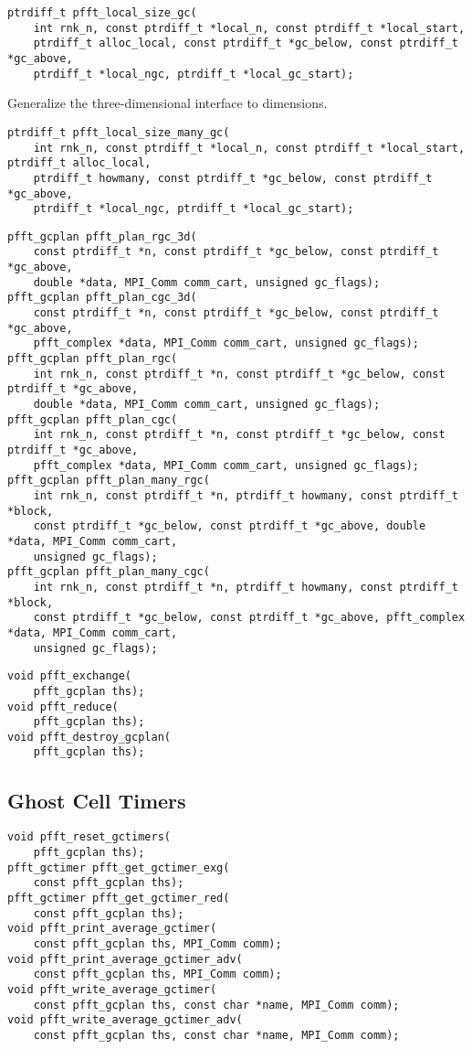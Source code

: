 \begin{lstlisting}
ptrdiff_t pfft_local_size_gc(
    int rnk_n, const ptrdiff_t *local_n, const ptrdiff_t *local_start,
    ptrdiff_t alloc_local, const ptrdiff_t *gc_below, const ptrdiff_t *gc_above,
    ptrdiff_t *local_ngc, ptrdiff_t *local_gc_start);
\end{lstlisting}
Generalize the three-dimensional interface to  dimensions.
\begin{lstlisting}
ptrdiff_t pfft_local_size_many_gc(
    int rnk_n, const ptrdiff_t *local_n, const ptrdiff_t *local_start, ptrdiff_t alloc_local,
    ptrdiff_t howmany, const ptrdiff_t *gc_below, const ptrdiff_t *gc_above,
    ptrdiff_t *local_ngc, ptrdiff_t *local_gc_start);
\end{lstlisting}

\begin{lstlisting}
pfft_gcplan pfft_plan_rgc_3d(
    const ptrdiff_t *n, const ptrdiff_t *gc_below, const ptrdiff_t *gc_above,
    double *data, MPI_Comm comm_cart, unsigned gc_flags);
pfft_gcplan pfft_plan_cgc_3d(
    const ptrdiff_t *n, const ptrdiff_t *gc_below, const ptrdiff_t *gc_above,
    pfft_complex *data, MPI_Comm comm_cart, unsigned gc_flags);
pfft_gcplan pfft_plan_rgc(
    int rnk_n, const ptrdiff_t *n, const ptrdiff_t *gc_below, const ptrdiff_t *gc_above,
    double *data, MPI_Comm comm_cart, unsigned gc_flags);
pfft_gcplan pfft_plan_cgc(
    int rnk_n, const ptrdiff_t *n, const ptrdiff_t *gc_below, const ptrdiff_t *gc_above,
    pfft_complex *data, MPI_Comm comm_cart, unsigned gc_flags);
pfft_gcplan pfft_plan_many_rgc(
    int rnk_n, const ptrdiff_t *n, ptrdiff_t howmany, const ptrdiff_t *block,
    const ptrdiff_t *gc_below, const ptrdiff_t *gc_above, double *data, MPI_Comm comm_cart,
    unsigned gc_flags);
pfft_gcplan pfft_plan_many_cgc(
    int rnk_n, const ptrdiff_t *n, ptrdiff_t howmany, const ptrdiff_t *block,
    const ptrdiff_t *gc_below, const ptrdiff_t *gc_above, pfft_complex *data, MPI_Comm comm_cart,
    unsigned gc_flags);
\end{lstlisting}

\begin{lstlisting}
void pfft_exchange(
    pfft_gcplan ths);
void pfft_reduce(
    pfft_gcplan ths);
void pfft_destroy_gcplan(
    pfft_gcplan ths);
\end{lstlisting}

\subsection{Ghost Cell Timers}
\begin{lstlisting}
void pfft_reset_gctimers(
    pfft_gcplan ths);
pfft_gctimer pfft_get_gctimer_exg(
    const pfft_gcplan ths);
pfft_gctimer pfft_get_gctimer_red(
    const pfft_gcplan ths);
void pfft_print_average_gctimer(
    const pfft_gcplan ths, MPI_Comm comm);
void pfft_print_average_gctimer_adv(
    const pfft_gcplan ths, MPI_Comm comm);
void pfft_write_average_gctimer(
    const pfft_gcplan ths, const char *name, MPI_Comm comm);
void pfft_write_average_gctimer_adv(
    const pfft_gcplan ths, const char *name, MPI_Comm comm);
\end{lstlisting}

